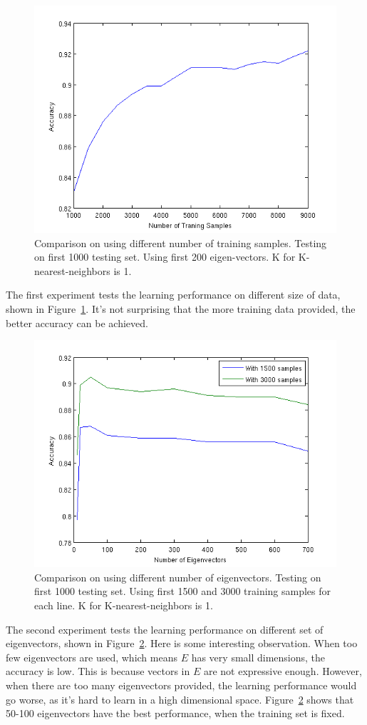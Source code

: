 \documentclass[10pt]{article}
\begin{document}
\begin{figure}
\centering
\includegraphics[width=0.5\columnwidth]{diffDataSet.png}
\caption{Comparison on using different number of training samples.
Testing on first 1000 testing set. Using first 200 eigen-vectors. K
for K-nearest-neighbors is 1.}
\label{fig:dataset}
\end{figure}

The first experiment tests the learning performance on different size
of data, shown in Figure~\ref{fig:dataset}. It's not surprising that
the more training data provided, the better accuracy can be achieved.

\begin{figure}
\centering
\includegraphics[width=0.5\columnwidth]{diffEVector.png}
\caption{Comparison on using different number of eigenvectors.
Testing on first 1000 testing set. Using first 1500 and 3000 training
samples for each line.  K for K-nearest-neighbors is 1.}
\label{fig:evec}
\end{figure}

The second experiment tests the learning performance on different set
of eigenvectors, shown in Figure~\ref{fig:evec}. Here is some
interesting observation. When too few eigenvectors are used, which
means $E$ has very small dimensions, the accuracy is low. This is
because vectors in $E$ are not expressive enough. However, when there
are too many eigenvectors provided, the learning performance would go
worse, as it's hard to learn in a high dimensional space.
Figure~\ref{fig:evec} shows that 50-100 eigenvectors have the best
performance, when the training set is fixed.
\end{document}
